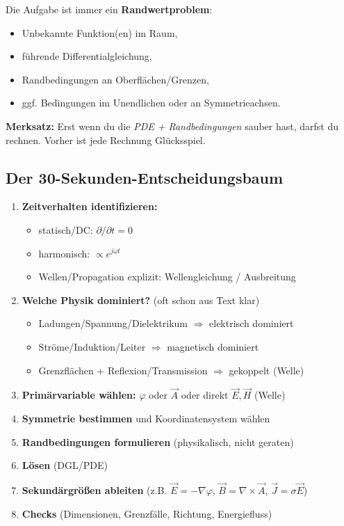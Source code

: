 \documentclass[a4paper]{article}
\newcommand{\imp}[1]{{\color{accent}\bfseries #1}}
\newcommand{\E}{\vec E}
\newcommand{\Hf}{\vec H}
\newcommand{\B}{\vec B}
\newcommand{\J}{\vec J}
\newcommand{\A}{\vec A}
\begin{document}
Die Aufgabe ist immer ein \imp{Randwertproblem}:
\begin{itemize}
  \item Unbekannte Funktion(en) im Raum,
  \item führende Differentialgleichung,
  \item Randbedingungen an Oberflächen/Grenzen,
  \item ggf. Bedingungen im Unendlichen oder an Symmetrieachsen.
\end{itemize}

\begin{schema}
\imp{Merksatz:} Erst wenn du die \emph{PDE + Randbedingungen} sauber hast, darfst du rechnen.
Vorher ist jede Rechnung Glücksspiel.
\end{schema}

\subsection{Der 30-Sekunden-Entscheidungsbaum}

\begin{vorgehen}
\begin{enumerate}
  \item \imp{Zeitverhalten identifizieren:}
  \begin{itemize}
    \item statisch/DC: $\partial/\partial t = 0$
    \item harmonisch: $\propto e^{j\omega t}$
    \item Wellen/Propagation explizit: Wellengleichung / Ausbreitung
  \end{itemize}

  \item \imp{Welche Physik dominiert?} (oft schon aus Text klar)
  \begin{itemize}
    \item Ladungen/Spannung/Dielektrikum $\Rightarrow$ elektrisch dominiert
    \item Ströme/Induktion/Leiter $\Rightarrow$ magnetisch dominiert
    \item Grenzflächen + Reflexion/Transmission $\Rightarrow$ gekoppelt (Welle)
  \end{itemize}

  \item \imp{Primärvariable wählen:} $\varphi$ oder $\A$ oder direkt $\E,\Hf$ (Welle)
  \item \imp{Symmetrie bestimmen} und Koordinatensystem wählen
  \item \imp{Randbedingungen formulieren} (physikalisch, nicht geraten)
  \item \imp{Lösen} (DGL/PDE)
  \item \imp{Sekundärgrößen ableiten} (z.B. $\E=-\nabla\varphi$, $\B=\nabla\times\A$, $\J=\sigma\E$)
  \item \imp{Checks} (Dimensionen, Grenzfälle, Richtung, Energiefluss)
\end{enumerate}
\end{vorgehen}
\end{document}
